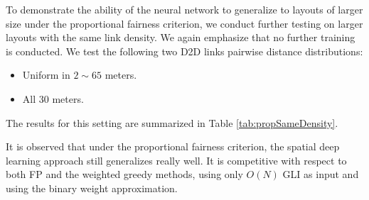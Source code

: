 \documentclass[journal,12pt,onecolumn,draftclsnofoot,]{IEEEtran}
\begin{document}
To demonstrate the ability of the neural network to generalize to layouts of
larger size under the proportional fairness criterion, we conduct further
testing on larger layouts with the same link density. 
We again emphasize that no further training is conducted. We test 
the following two D2D links pairwise distance distributions:
\begin{itemize}
    \item Uniform in $2\sim65$ meters.
    \item All $30$ meters.
\end{itemize}
The results for this setting are summarized in Table \ref{tab:propSameDensity}.

It is observed that under the proportional fairness criterion, the spatial deep
learning approach still generalizes really well. It is competitive with respect
to both FP and the weighted greedy methods, using only $O(N)$ GLI as input and 
using the binary weight approximation.
\end{document}

